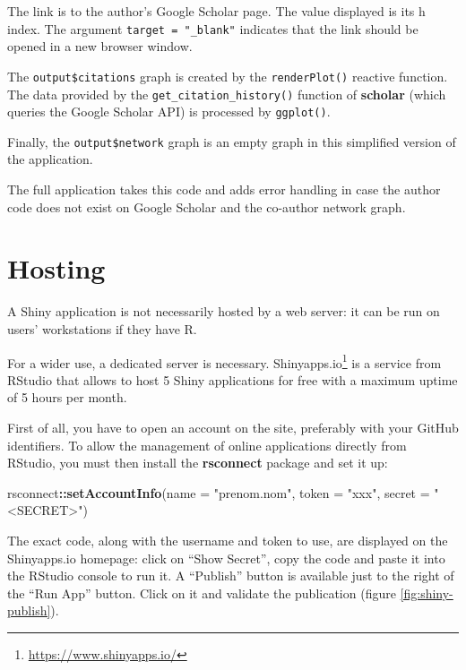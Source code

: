 \documentclass[
  12pt,
  american,
  a4paper,
  extrafontsizes,onecolumn,openright
  ]{memoir}
\newenvironment{Shaded}{\begin{snugshade}}{\end{snugshade}}
\newcommand{\AttributeTok}[1]{\textcolor[rgb]{0.13,0.29,0.53}{#1}}
\newcommand{\FunctionTok}[1]{\textcolor[rgb]{0.13,0.29,0.53}{\textbf{#1}}}
\newcommand{\NormalTok}[1]{#1}
\newcommand{\SpecialCharTok}[1]{\textcolor[rgb]{0.81,0.36,0.00}{\textbf{#1}}}
\newcommand{\StringTok}[1]{\textcolor[rgb]{0.31,0.60,0.02}{#1}}
\begin{document}
\normalsize

The link is to the author's Google Scholar page.
The value displayed is its h index.
The argument \texttt{target\ =\ "\_blank"} indicates that the link should be opened in a new browser window.

The \texttt{output\$citations} graph is created by the \texttt{renderPlot()} reactive function.
The data provided by the \texttt{get\_citation\_history()} function of \textbf{scholar} (which queries the Google Scholar API) is processed by \texttt{ggplot()}.

Finally, the \texttt{output\$network} graph is an empty graph in this simplified version of the application.

The full application takes this code and adds error handling in case the author code does not exist on Google Scholar and the co-author network graph.

\section{Hosting}\label{sec:hebergement-shiny}

A Shiny application is not necessarily hosted by a web server: it can be run on users' workstations if they have R.

For a wider use, a dedicated server is necessary.
Shinyapps.io\footnote{\url{https://www.shinyapps.io/}} is a service from RStudio that allows to host 5 Shiny applications for free with a maximum uptime of 5 hours per month.

First of all, you have to open an account on the site, preferably with your GitHub identifiers.
To allow the management of online applications directly from RStudio, you must then install the \textbf{rsconnect} package and set it up:

\scriptsize

\begin{Shaded}
\begin{Highlighting}[]
\NormalTok{rsconnect}\SpecialCharTok{::}\FunctionTok{setAccountInfo}\NormalTok{(}\AttributeTok{name =} \StringTok{"prenom.nom"}\NormalTok{, }\AttributeTok{token =} \StringTok{"xxx"}\NormalTok{,}
    \AttributeTok{secret =} \StringTok{"\textless{}SECRET\textgreater{}"}\NormalTok{)}
\end{Highlighting}
\end{Shaded}

\normalsize

The exact code, along with the username and token to use, are displayed on the Shinyapps.io homepage: click on \enquote{Show Secret}, copy the code and paste it into the RStudio console to run it.
A \enquote{Publish} button is available just to the right of the \enquote{Run App} button.
Click on it and validate the publication (figure \ref{fig:shiny-publish}).
\end{document}

